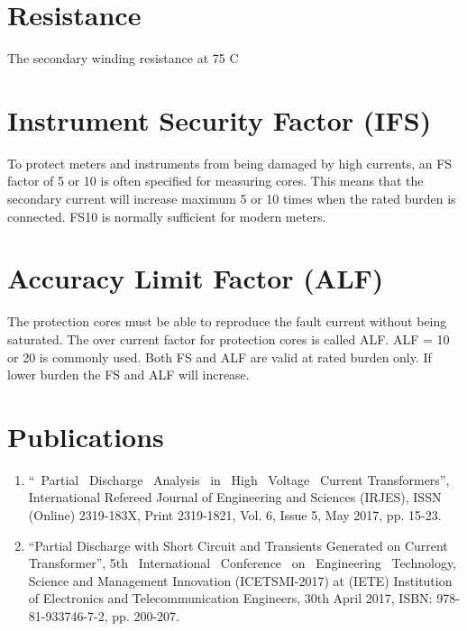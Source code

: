\section*{Resistance}
The secondary winding resistance at 75 \textdegree C
\section*{Instrument Security Factor (IFS)}
To protect meters and instruments from being damaged by high currents, an FS factor of 5 or 10 is often specified for measuring cores. This means that the secondary current will increase maximum 5 or 10 times when the rated burden is connected. FS10 is normally sufficient for modern meters.
\section*{Accuracy Limit Factor (ALF)}
The protection cores must be able to reproduce the fault current without being saturated. The over current factor for protection cores is called ALF. ALF = 10 or 20 is commonly used. Both FS and ALF are valid at rated burden only. If lower burden the FS and ALF will increase.
\setlength{\parskip}{0em}
\clearpage

\section*{Publications}
\begin{enumerate}
\item \textquotedblleft ~Partial ~Discharge ~Analysis ~in ~High ~Voltage ~Current Transformers\textquotedblright, International Refereed Journal of Engineering and Sciences (IRJES), ISSN (Online) 2319-183X, Print 2319-1821, Vol. 6, Issue 5, May 2017, pp. 15-23.

\item \textquotedblleft Partial Discharge with Short Circuit and Transients Generated on Current Transformer\textquotedblright, 5th ~International ~Conference ~on ~Engineering ~Technology, Science and Management Innovation (ICETSMI-2017) at (IETE) Institution of Electronics and Telecommunication Engineers, 30th April 2017, ISBN: 978-81-933746-7-2, pp. 200-207.
\end{enumerate}
\clearpage



\clearpage